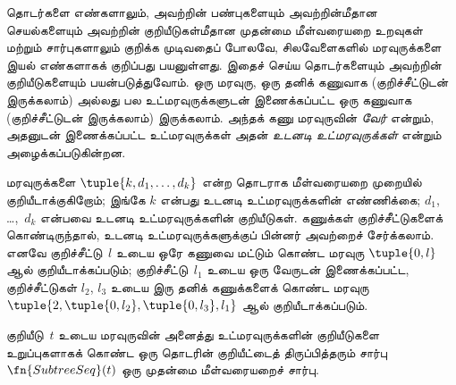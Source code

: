 \documentclass[../../../include/open-logic-section]{subfiles}
\begin{document}


தொடர்களை எண்களாலும், அவற்றின் பண்புகளையும் அவற்றின்மீதான செயல்களையும்
அவற்றின் குறியீடுகள்மீதான முதன்மை மீள்வரையறை உறவுகள் மற்றும்
சார்புகளாலும் குறிக்க முடிவதைப் போலவே, சிலவேளைகளில் மரவுருக்களை
இயல் எண்களாகக் குறிப்பது பயனுள்ளது. இதைச் செய்ய தொடர்களையும் அவற்றின்
குறியீடுகளையும் பயன்படுத்துவோம். ஒரு மரவுரு, ஒரு தனிக் கணுவாக
(குறிச்சீட்டுடன் இருக்கலாம்) அல்லது பல உட்மரவுருக்களுடன் இணைக்கப்பட்ட
ஒரு கணுவாக (குறிச்சீட்டுடன் இருக்கலாம்) இருக்கலாம். அந்தக் கணு
மரவுருவின் \emph{வேர்} என்றும், அதனுடன் இணைக்கப்பட்ட உட்மரவுருக்கள்
அதன் \emph{உடனடி உட்மரவுருக்கள்} என்றும் அழைக்கப்படுகின்றன.

மரவுருக்களை $\tuple{k, d_1, \dots, d_k}$ என்ற தொடராக மீள்வரையறை
முறையில் குறியீடாக்குகிறோம்; இங்கே $k$ என்பது உடனடி
உட்மரவுருக்களின் எண்ணிக்கை; $d_1$, \dots,~$d_k$ என்பவை உடனடி
உட்மரவுருக்களின் குறியீடுகள். கணுக்கள் குறிச்சீட்டுகளைக் கொண்டிருந்தால்,
உடனடி உட்மரவுருக்களுக்குப் பின்னர் அவற்றைச் சேர்க்கலாம். எனவே
குறிச்சீட்டு~$l$ உடைய ஒரே கணுவை மட்டும் கொண்ட மரவுரு
$\tuple{0,l}$ ஆல் குறியீடாக்கப்படும்; குறிச்சீட்டு~$l_1$ உடைய
ஒரு வேருடன் இணைக்கப்பட்ட, குறிச்சீட்டுகள் $l_2$, $l_3$ உடைய இரு
தனிக் கணுக்களைக் கொண்ட மரவுரு $\tuple{2,
  \tuple{0, l_2}, \tuple{0, l_3}, l_1}$ ஆல் குறியீடாக்கப்படும்.

\begin{prop}
  குறியீடு~$t$ உடைய மரவுருவின் அனைத்து உட்மரவுருக்களின்
  குறியீடுகளை உறுப்புகளாகக் கொண்ட ஒரு தொடரின் குறியீட்டைத்
  திருப்பித்தரும் சார்பு $\fn{SubtreeSeq}(t)$ ஒரு முதன்மை
  மீள்வரையறைச் சார்பு.
\end{prop}
\end{document}
